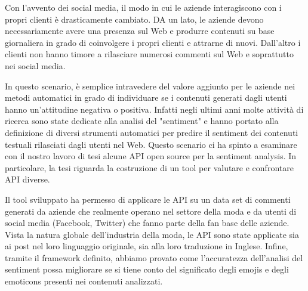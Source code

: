 Con l'avvento dei social media, il modo in cui le aziende interagiscono con i propri clienti è drasticamente cambiato. DA un lato, le aziende devono necessariamente avere una presenza sul Web e produrre contenuti su base giornaliera in grado di coinvolgere i propri clienti e attrarne di nuovi. Dall'altro i clienti non hanno timore a rilasciare numerosi commenti sul Web e soprattutto nei social media.  

In questo scenario, è semplice intravedere del valore aggiunto per le aziende nei metodi automatici in grado di individuare se i contenuti generati dagli utenti hanno un'attitudine negativa o positiva. Infatti negli ultimi anni molte attività di ricerca sono state dedicate alla analisi del "sentiment" e hanno portato alla definizione di diversi strumenti automatici per predire il sentiment dei contenuti testuali rilasciati dagli utenti nel Web. Questo scenario ci ha spinto a esaminare con il nostro lavoro di tesi alcune API open source per la sentiment analysis. In particolare, la tesi riguarda la costruzione di un tool per valutare e confrontare API diverse.

Il tool sviluppato ha permesso di applicare le API su un data set di commenti generati da aziende che realmente operano nel settore della moda e da utenti di social media (Facebook, Twitter) che fanno parte della fan base delle aziende. Vista la natura globale dell'industria della moda, le API sono state applicate sia ai post nel loro linguaggio originale, sia alla loro traduzione in Inglese. Infine, tramite il framework definito, abbiamo provato come l'accuratezza dell'analisi del sentiment possa migliorare se si tiene conto del  significato degli emojis e degli emoticons presenti nei contenuti analizzati.
